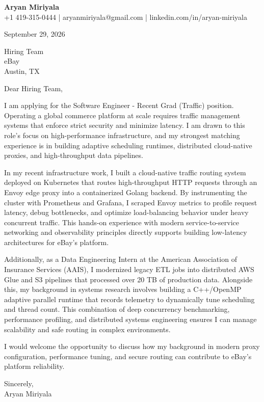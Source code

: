 \documentclass[letterpaper,11pt]{article}
\begin{document}
\textbf{\LARGE Aryan Miriyala}\\
+1 419-315-0444 | aryanmiriyala@gmail.com | linkedin.com/in/aryan-miriyala

September 29, 2026

Hiring Team\\
eBay\\
Austin, TX

Dear Hiring Team,

I am applying for the Software Engineer - Recent Grad (Traffic) position. Operating a global commerce platform at scale requires traffic management systems that enforce strict security and minimize latency. I am drawn to this role's focus on high-performance infrastructure, and my strongest matching experience is in building adaptive scheduling runtimes, distributed cloud-native proxies, and high-throughput data pipelines.

In my recent infrastructure work, I built a cloud-native traffic routing system deployed on Kubernetes that routes high-throughput HTTP requests through an Envoy edge proxy into a containerized Golang backend. By instrumenting the cluster with Prometheus and Grafana, I scraped Envoy metrics to profile request latency, debug bottlenecks, and optimize load-balancing behavior under heavy concurrent traffic. This hands-on experience with modern service-to-service networking and observability principles directly supports building low-latency architectures for eBay's platform.

Additionally, as a Data Engineering Intern at the American Association of Insurance Services (AAIS), I modernized legacy ETL jobs into distributed AWS Glue and S3 pipelines that processed over 20 TB of production data. Alongside this, my background in systems research involves building a C++/OpenMP adaptive parallel runtime that records telemetry to dynamically tune scheduling and thread count. This combination of deep concurrency benchmarking, performance profiling, and distributed systems engineering ensures I can manage scalability and safe routing in complex environments.

I would welcome the opportunity to discuss how my background in modern proxy configuration, performance tuning, and secure routing can contribute to eBay's platform reliability.

Sincerely,\\
Aryan Miriyala
\end{document}
